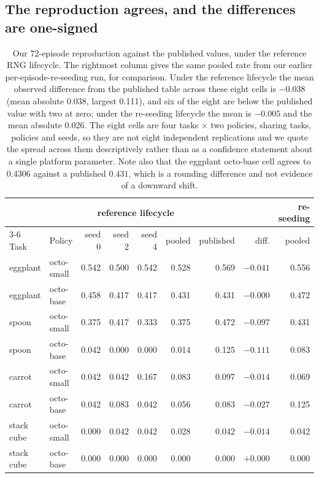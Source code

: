 \documentclass[pdflatex,iicol,sn-apa]{sn-jnl}
\theoremstyle{remark}
\begin{document}
\subsection{The reproduction agrees, and the differences are one-signed}\label{subsec6_2}

\begin{table}[t]
\caption{Our 72-episode reproduction against the published values, under the reference RNG
lifecycle. The rightmost column gives the same pooled rate from our earlier per-episode-re-seeding
run, for comparison. Under the reference lifecycle the mean observed difference from the published
table across these eight cells is $-0.038$ (mean absolute 0.038, largest 0.111), and six of the
eight are below the published value with two at zero; under the re-seeding lifecycle the mean is
$-0.005$ and the mean absolute 0.026. The eight cells are four tasks $\times$ two policies, sharing
tasks, policies and seeds, so they are not eight independent replications and we quote the spread
across them descriptively rather than as a confidence statement about a single platform
parameter. Note also that the eggplant octo-base cell agrees to $0.4306$ against a published
$0.431$, which is a rounding difference and not evidence of a downward shift.}\label{tab4}
\begin{tabular}{@{}llrrrrrrr@{}}
\toprule
 & & \multicolumn{4}{c}{reference lifecycle} & & & re-seeding \\
\cmidrule(lr){3-6}
Task & Policy & seed 0 & seed 2 & seed 4 & pooled & published & diff. & pooled \\
\midrule
eggplant & octo-small & 0.542 & 0.500 & 0.542 & 0.528 & 0.569 & $-0.041$ & 0.556 \\
eggplant & octo-base & 0.458 & 0.417 & 0.417 & 0.431 & 0.431 & $-0.000$ & 0.472 \\
spoon & octo-small & 0.375 & 0.417 & 0.333 & 0.375 & 0.472 & $-0.097$ & 0.431 \\
spoon & octo-base & 0.042 & 0.000 & 0.000 & 0.014 & 0.125 & $\mathbf{-0.111}$ & 0.083 \\
carrot & octo-small & 0.042 & 0.042 & 0.167 & 0.083 & 0.097 & $-0.014$ & 0.069 \\
carrot & octo-base & 0.042 & 0.083 & 0.042 & 0.056 & 0.083 & $-0.027$ & 0.125 \\
stack cube & octo-small & 0.000 & 0.042 & 0.042 & 0.028 & 0.042 & $-0.014$ & 0.042 \\
stack cube & octo-base & 0.000 & 0.000 & 0.000 & 0.000 & 0.000 & $+0.000$ & 0.000 \\
\bottomrule
\end{tabular}
\end{table}
\end{document}
